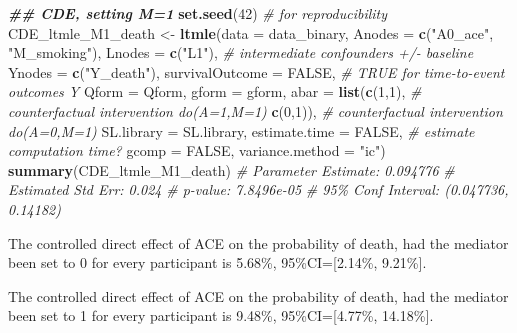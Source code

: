 \documentclass[
]{book}
\newenvironment{Shaded}{\begin{snugshade}}{\end{snugshade}}
\newcommand{\AttributeTok}[1]{\textcolor[rgb]{0.13,0.29,0.53}{#1}}
\newcommand{\CommentTok}[1]{\textcolor[rgb]{0.56,0.35,0.01}{\textit{#1}}}
\newcommand{\ConstantTok}[1]{\textcolor[rgb]{0.56,0.35,0.01}{#1}}
\newcommand{\DecValTok}[1]{\textcolor[rgb]{0.00,0.00,0.81}{#1}}
\newcommand{\DocumentationTok}[1]{\textcolor[rgb]{0.56,0.35,0.01}{\textbf{\textit{#1}}}}
\newcommand{\FunctionTok}[1]{\textcolor[rgb]{0.13,0.29,0.53}{\textbf{#1}}}
\newcommand{\NormalTok}[1]{#1}
\newcommand{\OtherTok}[1]{\textcolor[rgb]{0.56,0.35,0.01}{#1}}
\newcommand{\StringTok}[1]{\textcolor[rgb]{0.31,0.60,0.02}{#1}}
\begin{document}
\begin{Shaded}
\begin{Highlighting}[]
\DocumentationTok{\#\# CDE, setting M=1}
\FunctionTok{set.seed}\NormalTok{(}\DecValTok{42}\NormalTok{) }\CommentTok{\# for reproducibility}
\NormalTok{CDE\_ltmle\_M1\_death }\OtherTok{\textless{}{-}} \FunctionTok{ltmle}\NormalTok{(}\AttributeTok{data =}\NormalTok{ data\_binary,}
                            \AttributeTok{Anodes =} \FunctionTok{c}\NormalTok{(}\StringTok{"A0\_ace"}\NormalTok{, }\StringTok{"M\_smoking"}\NormalTok{),}
                            \AttributeTok{Lnodes =} \FunctionTok{c}\NormalTok{(}\StringTok{"L1"}\NormalTok{), }\CommentTok{\# intermediate confounders +/{-} baseline}
                            \AttributeTok{Ynodes =} \FunctionTok{c}\NormalTok{(}\StringTok{"Y\_death"}\NormalTok{),}
                            \AttributeTok{survivalOutcome =} \ConstantTok{FALSE}\NormalTok{, }\CommentTok{\# TRUE for time{-}to{-}event outcomes Y}
                            \AttributeTok{Qform =}\NormalTok{ Qform,}
                            \AttributeTok{gform =}\NormalTok{ gform,}
                            \AttributeTok{abar =} \FunctionTok{list}\NormalTok{(}\FunctionTok{c}\NormalTok{(}\DecValTok{1}\NormalTok{,}\DecValTok{1}\NormalTok{), }\CommentTok{\# counterfactual intervention do(A=1,M=1)}
                                        \FunctionTok{c}\NormalTok{(}\DecValTok{0}\NormalTok{,}\DecValTok{1}\NormalTok{)), }\CommentTok{\# counterfactual intervention do(A=0,M=1)}
                            \AttributeTok{SL.library =}\NormalTok{ SL.library,}
                            \AttributeTok{estimate.time =} \ConstantTok{FALSE}\NormalTok{, }\CommentTok{\# estimate computation time?}
                            \AttributeTok{gcomp =} \ConstantTok{FALSE}\NormalTok{,}
                            \AttributeTok{variance.method =} \StringTok{"ic"}\NormalTok{)}
\FunctionTok{summary}\NormalTok{(CDE\_ltmle\_M1\_death)}
\CommentTok{\# Parameter Estimate:  0.094776}
\CommentTok{\#  Estimated Std Err:  0.024}
\CommentTok{\#            p{-}value:  7.8496e{-}05}
\CommentTok{\#  95\% Conf Interval: (0.047736, 0.14182)}
\end{Highlighting}
\end{Shaded}

The controlled direct effect of ACE on the probability of death, had the mediator been set to 0 for every participant is 5.68\%, 95\%CI={[}2.14\%, 9.21\%{]}.

The controlled direct effect of ACE on the probability of death, had the mediator been set to 1 for every participant is 9.48\%, 95\%CI={[}4.77\%, 14.18\%{]}.
\end{document}
